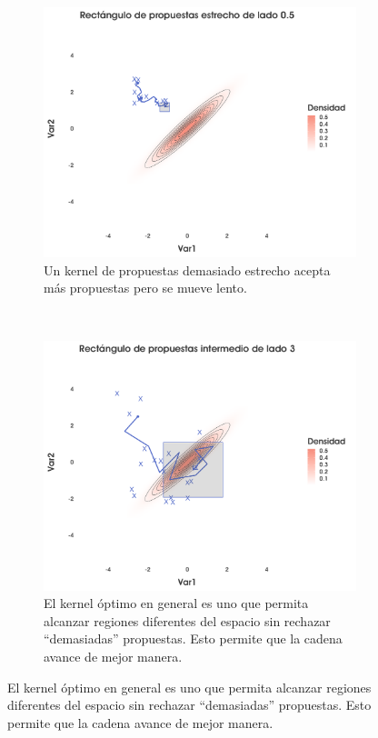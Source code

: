 \begin{figure}[h]
    \centering
    \begin{subfigure}{0.3\textwidth}
        \includegraphics[width=\textwidth]{Figs/Bayes/Ejemplo_RWM_Compara1}
        \caption{Un kernel de propuestas demasiado estrecho acepta más propuestas pero se mueve lento.}
    \end{subfigure}
    ~ 
    \begin{subfigure}{0.3\textwidth}
        \includegraphics[width=\textwidth]{Figs/Bayes/Ejemplo_RWM_Compara2}
        \caption{El kernel óptimo en general es uno que permita alcanzar regiones diferentes del espacio sin rechazar ``demasiadas'' propuestas. Esto permite que la cadena avance de mejor manera.}

\end{subfigure}
\end{figure}
